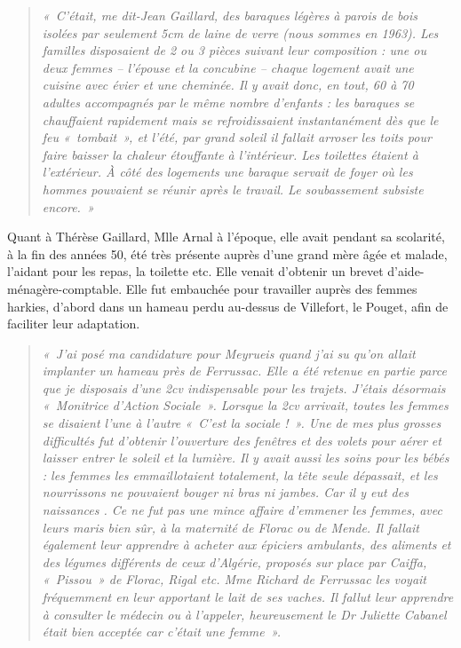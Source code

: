\begin{quote}
\textit{«~C’était, me dit-Jean Gaillard, des baraques légères à parois de bois isolées par
seulement 5cm de laine de verre (nous sommes en 1963). Les familles disposaient de
2 ou 3 pièces suivant leur composition : une ou deux femmes -- l’épouse et la
concubine -- chaque logement avait une cuisine avec évier et une cheminée. Il y avait
donc, en tout, 60 à 70 adultes accompagnés par le même nombre d’enfants : les
baraques se chauffaient rapidement mais se refroidissaient instantanément dès que le
feu «~tombait~», et l’été, par grand soleil il fallait arroser les toits pour faire baisser
la chaleur étouffante à l’intérieur. Les toilettes étaient à l’extérieur. À côté des
logements une baraque servait de foyer où les hommes pouvaient se réunir après le
travail. Le soubassement subsiste encore.~»}
\end{quote}

Quant à Thérèse Gaillard, Mlle Arnal à l’époque, elle avait pendant sa scolarité, à la
fin des années 50, été très présente auprès d’une grand mère âgée et malade, l’aidant
pour les repas, la toilette etc. Elle venait d’obtenir un brevet d’aide-ménagère-comptable. Elle fut embauchée pour travailler auprès des femmes harkies, d’abord
dans un hameau perdu au-dessus de Villefort, le Pouget, afin de faciliter leur
adaptation.

\begin{quote}
\textit{«~J’ai posé ma candidature pour Meyrueis quand j’ai su qu’on allait implanter un
hameau près de Ferrussac. Elle a été retenue en partie parce que je disposais d’une
2cv indispensable pour les trajets. J’étais désormais «~Monitrice d’Action Sociale~».
Lorsque la 2cv arrivait, toutes les femmes se disaient l’une à l’autre «~C’est la
sociale !~».
Une de mes plus grosses difficultés fut d’obtenir l’ouverture des fenêtres et des volets
pour aérer et laisser entrer le soleil et la lumière. Il y avait aussi les soins pour les
bébés : les femmes les emmaillotaient totalement, la tête seule dépassait, et les
nourrissons ne pouvaient bouger ni bras ni jambes. Car il y eut des naissances . Ce
ne fut pas une mince affaire d’emmener les femmes, avec leurs maris bien sûr, à la
maternité de Florac ou de Mende. Il fallait également leur apprendre à acheter aux
épiciers ambulants, des aliments et des légumes différents de ceux d’Algérie,
proposés sur place par Caiffa, «~Pissou~» de Florac, Rigal etc. Mme Richard de
Ferrussac les voyait fréquemment en leur apportant le lait de ses vaches.
Il fallut leur apprendre à consulter le médecin ou à l’appeler, heureusement le Dr
Juliette Cabanel était bien acceptée car c’était une femme~».}
\end{quote}

